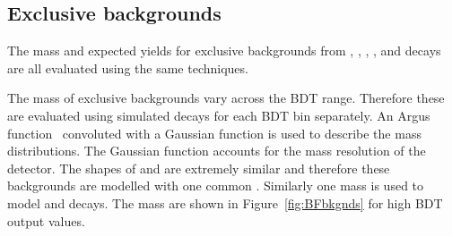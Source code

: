 {%

\subsection{Exclusive backgrounds}%
The mass \pdfs and expected yields for exclusive backgrounds from \bdpimunu, \bsKmunu, \lambdab, \bupimumu, \bdpimumu and \bcjpsimunu decays are all evaluated using the same techniques.

The mass \pdfs of exclusive backgrounds vary across the BDT range. Therefore these \pdfs are evaluated using simulated decays for each BDT bin separately. An Argus function~\cite{Argus_pdf} convoluted with a Gaussian function is used to describe the mass distributions. The Gaussian function accounts for the mass resolution of the detector. The shapes of \bdpimunu and \bsKmunu are extremely similar and therefore these backgrounds are modelled with one common \pdf. Similarly one mass \pdf is used to model \bupimumu and \bdpimumu decays. The mass \pdfs are shown in Figure~\ref{fig:BFbkgnds} for high BDT output values. %

}
